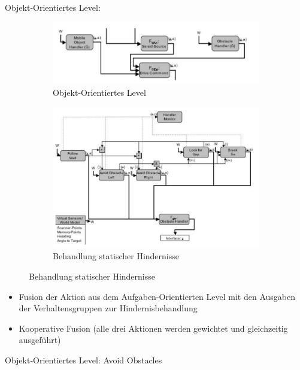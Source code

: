 Objekt-Orientiertes Level:
\begin{figure}
	\begin{subfigure}{.5\textwidth}
		\centering
		\includegraphics[width=\textwidth]{figures/objekt_level.png}
		\caption{Objekt-Orientiertes Level}
	\end{subfigure}
	\begin{subfigure}{.5\textwidth}
		\centering
		\includegraphics[width=\textwidth]{figures/objekt_level_1.png}
		\caption{Behandlung statischer Hindernisse}
	\end{subfigure}
	\label{ch:08:fig:objekt-orientiert}
\end{figure}
\begin{itemize}
	\item Fusion der Aktion aus dem Aufgaben-Orientierten Level mit den Ausgaben der Verhaltensgruppen zur Hindernisbehandlung
	\item Kooperative Fusion (alle drei Aktionen werden gewichtet und gleichzeitig ausgeführt)
\end{itemize}
Objekt-Orientiertes Level: Avoid Obstacles
